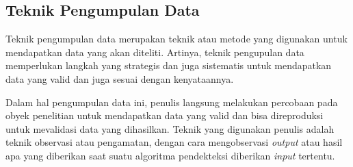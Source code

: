 \documentclass[a4paper]{article}
\begin{document}
\subsection*{Teknik Pengumpulan Data}
Teknik pengumpulan data merupakan teknik atau metode yang digunakan untuk mendapatkan data yang akan diteliti. Artinya, teknik pengupulan data memperlukan langkah yang strategis dan juga sistematis untuk mendapatkan data yang valid dan juga sesuai dengan kenyataannya\autocite{penerbitdeepublish-2}.

Dalam hal pengumpulan data ini, penulis langsung melakukan percobaan pada obyek penelitian untuk mendapatkan data yang valid dan bisa direproduksi untuk mevalidasi data yang dihasilkan. Teknik yang digunakan penulis adalah teknik observasi atau pengamatan, dengan cara mengobservasi \textit{output} atau hasil apa yang diberikan saat suatu algoritma pendekteksi diberikan \textit{input} tertentu.

\newpage
{}
\printbibliography[title=Referensi]
\end{document}
